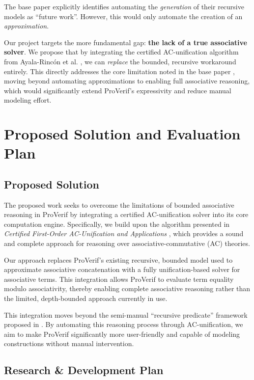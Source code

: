 \documentclass[journal]{IEEEtran}
\begin{document}
The base paper \cite{cheval2023hash} explicitly identifies automating the \emph{generation} of their recursive models as ``future work''. However, this would only automate the creation of an \emph{approximation}.

Our project targets the more fundamental gap: \textbf{the lack of a true associative solver}. We propose that by integrating the certified AC-unification algorithm from Ayala-Rincón et al. \cite{ayala2024certified}, we can \emph{replace} the bounded, recursive workaround entirely. This directly addresses the core limitation noted in the base paper \cite{cheval2023hash}, moving beyond automating approximations to enabling full associative reasoning, which would significantly extend ProVerif’s expressivity and reduce manual modeling effort.

\section{Proposed Solution and Evaluation Plan}

\subsection{Proposed Solution}

The proposed work seeks to overcome the limitations of bounded associative reasoning in ProVerif by integrating a certified AC-unification solver into its core computation engine. Specifically, we build upon the algorithm presented in \textit{Certified First-Order AC-Unification and Applications} \cite{ayala2024certified}, which provides a sound and complete approach for reasoning over associative-commutative (AC) theories. 

Our approach replaces ProVerif’s existing recursive, bounded model used to approximate associative concatenation with a fully unification-based solver for associative terms. This integration allows ProVerif to evaluate term equality modulo associativity, thereby enabling complete associative reasoning rather than the limited, depth-bounded approach currently in use. 

This integration moves beyond the semi-manual “recursive predicate” framework proposed in \cite{cheval2023hash}. By automating this reasoning process through AC-unification, we aim to make ProVerif significantly more user-friendly and capable of modeling constructions without manual intervention.

\subsection{Research \& Development Plan}
\end{document}
